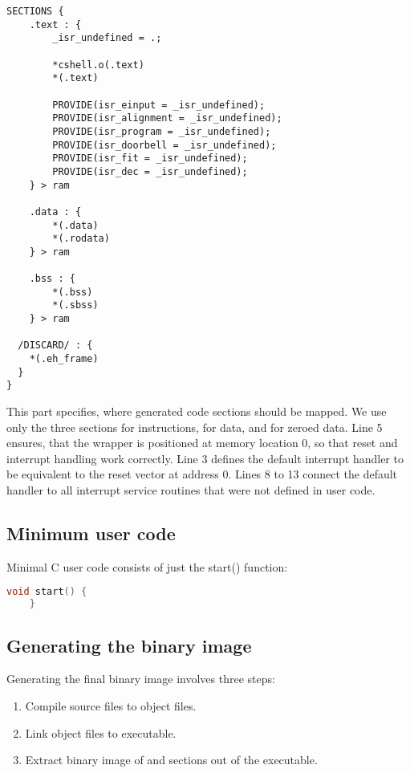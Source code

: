 \begin{lstlisting}
SECTIONS {
	.text : {
        _isr_undefined = .;

        *cshell.o(.text)
        *(.text)

        PROVIDE(isr_einput = _isr_undefined);
        PROVIDE(isr_alignment = _isr_undefined);
        PROVIDE(isr_program = _isr_undefined);
        PROVIDE(isr_doorbell = _isr_undefined);
        PROVIDE(isr_fit = _isr_undefined);
        PROVIDE(isr_dec = _isr_undefined);
	} > ram

	.data : {
		*(.data)
		*(.rodata)
	} > ram

	.bss : {
		*(.bss)
		*(.sbss)
	} > ram

  /DISCARD/ : {
    *(.eh_frame)
  }
}
\end{lstlisting}
This part specifies, where generated code sections should be mapped.
We use only the three sections  for instructions,  for data, and  for zeroed data.
Line 5 ensures, that the wrapper is positioned at memory location 0, so that reset and interrupt handling work correctly.
Line 3 defines the default interrupt handler  to be equivalent to the reset vector at address 0.
Lines 8 to 13 connect the default handler to all interrupt service routines that were not defined in user code.


\subsection{Minimum user code}

Minimal C user code consists of just the start() function:
\begin{lstlisting}[language=c]
    void start() {
    }
\end{lstlisting}
\subsection{Generating the binary image}

Generating the final binary image involves three steps:
\begin{enumerate}
    \item Compile source files to object files.
    \item Link object files to executable.
    \item Extract binary image of  and  sections out of the executable.
\end{enumerate}

